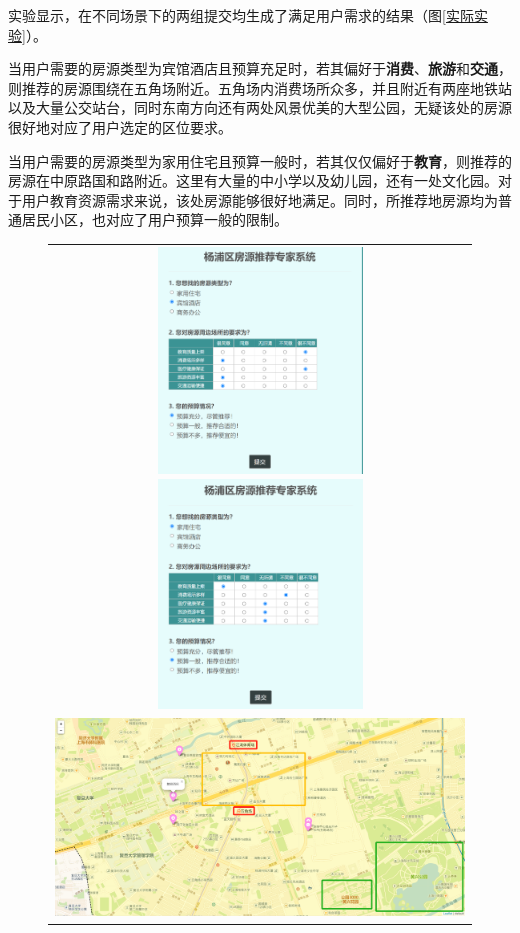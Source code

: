 \documentclass{article}
\begin{document}
实验显示，在不同场景下的两组提交均生成了满足用户需求的结果（图\ref{实际实验}）。

当用户需要的房源类型为宾馆酒店且预算充足时，若其偏好于\textbf{消费}、\textbf{旅游}和\textbf{交通}，则推荐的房源围绕在五角场附近。五角场内消费场所众多，并且附近有两座地铁站以及大量公交站台，同时东南方向还有两处风景优美的大型公园，无疑该处的房源很好地对应了用户选定的区位要求。

当用户需要的房源类型为家用住宅且预算一般时，若其仅仅偏好于\textbf{教育}，则推荐的房源在中原路国和路附近。这里有大量的中小学以及幼儿园，还有一处文化园。对于用户教育资源需求来说，该处房源能够很好地满足。同时，所推荐地房源均为普通居民小区，也对应了用户预算一般的限制。

\begin{figure}[htbp]
\centering
    \begin{tabular}{c}
        \includegraphics[width=0.5\textwidth]{./pic/用例1表单.png}
        \includegraphics[width=0.5\textwidth]{./pic/用例2表单.png} \\
        \includegraphics[width=\textwidth]{./pic/用例1结果.png} \\

\end{tabular}
\end{figure}
\end{document}
